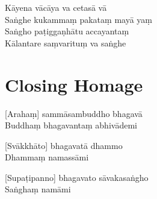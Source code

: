 
Kāyena vācāya va cetasā vā\\
Saṅghe kukammaṃ pakataṃ mayā yaṃ\\
Saṅgho paṭiggaṇhātu accayantaṃ\\
Kālantare saṃvarituṃ va saṅghe

\section*{Closing Homage}

[Arahaṃ] sammāsambuddho bhagavā\\
Buddhaṃ bhagavantaṃ abhivādemi

[Svākkhāto] bhagavatā dhammo\\
Dhammaṃ namassāmi

[Supaṭipanno] bhagavato sāvakasaṅgho\\
Saṅghaṃ namāmi

